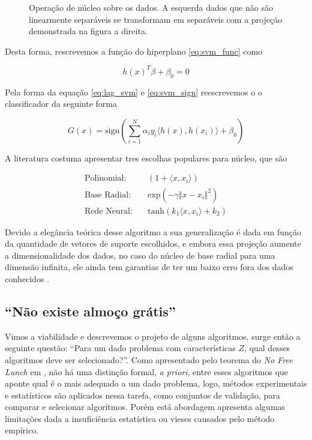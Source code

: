 \begin{figure}[ht]
   \centering
    \def\svgwidth{\linewidth}
    \caption{Operação de núcleo sobre os dados. A esquerda dados que não são
    linearmente separáveis se transformam em separáveis com a projeção
    demonstrada na figura a direita.}
    \label{fig:svm_kernel}
\end{figure}

Desta forma, rescrevemos a função do hiperplano \ref{eq:svm_func} como

 \begin{equation}
    \label{eq:svm_kernel}
    h(x)^T\beta + \beta_0 = 0
\end{equation}

Pela forma da equação \ref{eq:lag_svm} e \ref{eq:svm_sign} reescrevemos o
o classificador da seguinte forma

\begin{equation}
    G(x) = \text{sign}
    \left(\sum_{i=1}^N \alpha_i y_i \langle h(x),h(x_i)\rangle+\beta_0 \right)
\end{equation}

A literatura costuma apresentar tres escolhas populares para núcleo, que são

\begin{equation}
    \begin{split}
        \text{Polinomial:} &\quad (1+\langle x,x_i\rangle)\\
        \text{Base Radial:} &\quad \text{exp}(-\gamma \Vert x - x_i\Vert^2)\\
        \text{Rede Neural:} &\quad \text{tanh}(k_1\langle x,x_i\rangle+k_2)
    \end{split}
\end{equation}

Devido a elegância teórica desse algoritmo a sua generalização é dada em função
da quantidade de vetores de suporte escolhidos, e embora essa projeção aumente
a dimensionalidade dos dados, no caso do núcleo de base radial para uma
dimensão infinita, ele ainda tem garantias de ter um baixo erro fora dos dados
conhecidos \cite{vapnik2013nature}.

\subsection{``Não existe almoço grátis''}
Vimos a viabilidade e descrevemos o projeto de alguns algoritmos, surge então a
seguinte questão: ``Para um dado problema com características $Z$, qual desses
algoritmos deve ser selecionado?''. Como apresentado pelo teorema do \textit{No
Free Lunch} em \cite{wolpert1997no,wolpert1996lack}, não há uma distinção
formal, \textit{a priori}, entre esses algoritmos que aponte qual é o mais
adequado a um dado problema, logo, métodos experimentais e estatísticos são
aplicados nessa tarefa, como conjuntos de validação, para comparar e selecionar
algoritmos. Porém está abordagem apresenta algumas limitações dada a
insuficiência estatística ou vieses causados pelo método empírico.


